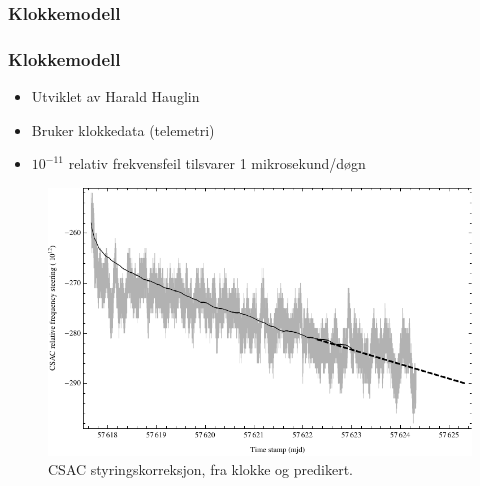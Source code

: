 \documentclass[xcolor=table]{beamer}
\begin{document}
\subsubsection{Klokkemodell}
\begin{frame}
  \frametitle{Klokkemodell}
  \begin{itemize}
    \item Utviklet av Harald Hauglin
    \item Bruker klokkedata (telemetri)
    \item $10^{-11}$ relativ frekvensfeil tilsvarer 1 mikrosekund/døgn
  \end{itemize}
    \begin{figure}
        \includegraphics[scale=0.5]{thesis/graphics/csac_modelling_prediction.pdf}
      \caption{CSAC styringskorreksjon, fra klokke og predikert.}
    \end{figure}
\end{frame}
\end{document}
